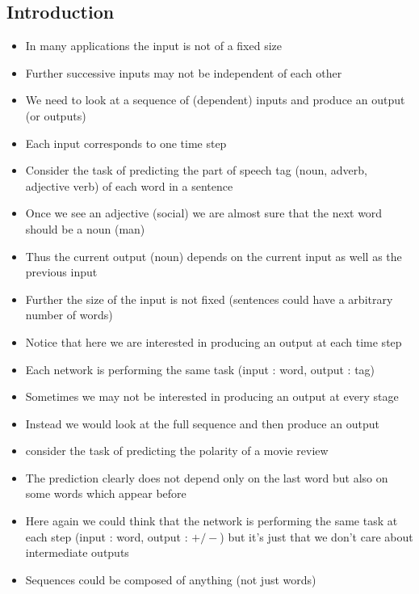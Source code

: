\documentclass[a4paper]{article}
\begin{document}
\subsection{Introduction}
\begin{itemize}
    \item In many applications the input is not of a fixed size
    \item Further successive inputs may not be independent of each other
    \item We need to look at a sequence of (dependent) inputs and produce an output (or outputs)
    \item Each input corresponds to one time step
    \item Consider the task of predicting the part of speech tag (noun, adverb, adjective verb) of each word in a sentence
    \item Once we see an adjective (social) we are almost sure that the next word should be a noun (man)
    \item Thus the current output (noun) depends on the current input as well as the previous input
    \item Further the size of the input is not fixed (sentences could have a arbitrary number of words)
    \item Notice that here we are interested in producing an output at each time step
    \item Each network is performing the same task (input : word, output : tag)
    \item Sometimes we may not be interested in producing an output at every stage
    \item Instead we would look at the full sequence and then produce an output
    \item consider the task of predicting the polarity of a movie review
    \item The prediction clearly does not depend only on the last word but also on some words which appear before
    \item Here again we could think that the network is performing the same task at each step (input : word, output : $+/-$) but it’s just that we don’t care about intermediate outputs
    \item Sequences could be composed of anything (not just words)
\end{itemize}
\end{document}
